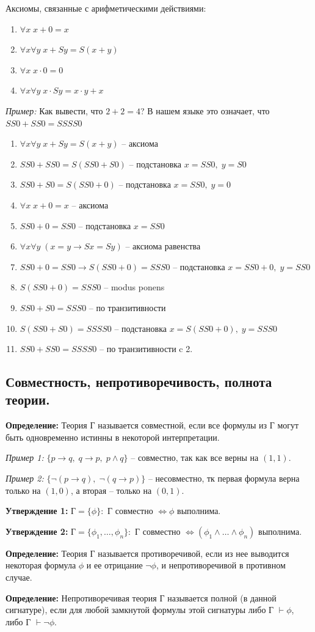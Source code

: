 Аксиомы, связанные с арифметическими действиями:
\begin{enumerate}
    \item $\forall x \; x+0=x$
    \item $\forall x \forall y \; x+Sy=S(x+y)$
    \item $\forall x \; x\cdot 0 = 0$
    \item $\forall x \forall y \; x\cdot Sy = x\cdot y + x$
\end{enumerate}

\textit{Пример:} Как вывести, что $2+2 = 4$? В нашем языке это означает, что $SS0+SS0=SSSS0$
\begin{enumerate}
    \item $\forall x \forall y \; x+Sy = S(x+y)$ -- аксиома
    \item $SS0+SS0 = S(SS0+S0)$ -- подстановка $x=SS0, \; y=S0$
    \item $SS0+S0 = S(SS0+0)$ -- подстановка $x=SS0, \; y=0$
    \item $\forall x \; x+0 = x$ -- аксиома
    \item $SS0 + 0 = SS0$ -- подстановка $x=SS0$
    \item $\forall x \forall y \; (x=y \to Sx = Sy)$ -- аксиома равенства
    \item $SS0+0 = SS0\to S(SS0 + 0)=SSS0$ -- подстановка $x=SS0+0,\; y=SS0$
    \item $S(SS0+0)=SSS0$ -- modus ponens
    \item $SS0 + S0 = SSS0$ -- по транзитивности
    \item $S(SS0+S0)=SSSS0$ -- подстановка $x=S(SS0+0), \; y=SSS0$
    \item $SS0 + SS0 = SSSS0$ -- по транзитивности c 2.
\end{enumerate}

\subsection{Совместность, непротиворечивость, полнота теории.}

\textbf{Определение:} Теория Г называется совместной, если все формулы из Г могут быть одновременно истинны в некоторой интерпретации.

\textit{Пример 1:} $\{p \to q,\; q\to p,\; p\land q\}$ -- совместно, так как все верны на $(1,1)$.

\textit{Пример 2:} $\{ \neg (p \to q),\; \neg (q\to p)\}$ -- несовместно, тк первая формула верна только на $(1,0)$, а вторая -- только на $(0,1)$.

\textbf{Утверждение 1:} Г$=\{\phi\}:$ Г совместно $\Leftrightarrow \phi$ выполнима.

\textbf{Утверждение 2:} Г$=\{\phi_1,\ldots,\phi_n\}:$ Г совместно $\Leftrightarrow (\phi_1\land\ldots\land\phi_n)$ выполнима.
\newline \par \textbf{Определение:} Теория Г называется противоречивой, если из нее выводится некоторая формула $\phi$ и ее отрицание $\neg\phi$, и непротиворечивой в противном случае.

\textbf{Определение:} Непротиворечивая теория Г называется полной (в данной сигнатуре), если для любой замкнутой формулы  этой сигнатуры либо Г $\vdash\phi$, либо Г $\vdash\neg\phi$.